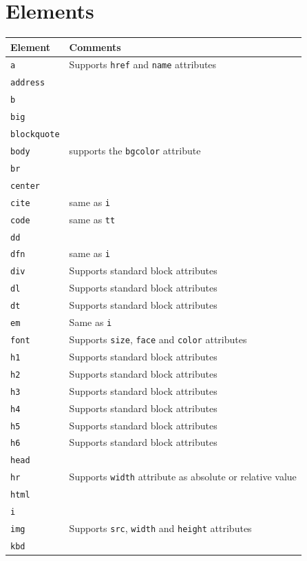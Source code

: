 \documentclass[a4paper,10pt]{book}
\begin{document}
\section{Elements}
\begin{tabular}{p{3cm} p{10.6cm}}
\hline
\textbf{Element} & \textbf{Comments} \\
\hline
\verb|a| & Supports \verb|href| and \verb|name| attributes\\
\verb|address| &\\
\verb|b|&\\
\verb|big|&\\
\verb|blockquote|&\\
\verb|body|& supports the \verb|bgcolor| attribute\\
\verb|br|&\\
\verb|center|&\\
\verb|cite|& same as \verb|i|\\
\verb|code|& same as \verb|tt|\\
\verb|dd|&\\
\verb|dfn|& same as \verb|i|\\
\verb|div| & Supports standard block attributes\\
\verb|dl| & Supports standard block attributes\\
\verb|dt| & Supports standard block attributes\\
\verb|em| & Same as \verb|i|\\
\verb|font| & Supports \verb|size|, \verb|face| and \verb|color| attributes\\
\verb|h1| & Supports standard block attributes\\
\verb|h2| & Supports standard block attributes\\
\verb|h3| & Supports standard block attributes\\
\verb|h4| & Supports standard block attributes\\
\verb|h5| & Supports standard block attributes\\
\verb|h6| & Supports standard block attributes\\
\verb|head|&\\
\verb|hr|&Supports \verb|width| attribute as absolute or relative value\\
\verb|html| &\\
\verb|i| &\\
\verb|img| & Supports \verb|src|, \verb|width| and \verb|height| attributes\\
\verb|kbd| &\\
\hline
\end{tabular}
\end{document}
